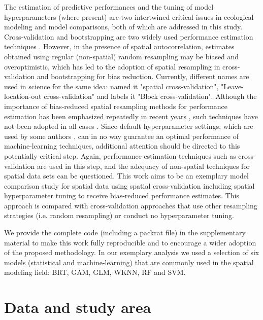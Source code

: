 \documentclass[review]{elsarticle}
\begin{document}
The estimation of predictive performances and the tuning of model hyperparameters (where present) are two intertwined critical issues in ecological modeling and model comparisons, both of which are addressed in this study.
Cross-validation and bootstrapping are two widely used performance estimation techniques \citep{Brenning2005, Kohavi1995}.
However, in the presence of spatial autocorrelation, estimates obtained using regular (non-spatial) random resampling may be biased and overoptimistic, which has led to the adoption of spatial resampling in cross-validation and bootstrapping for bias reduction.
Currently, different names are used in science for the same idea: \cite{Brenning2005} named it "spatial cross-validation", \cite{Meyer2018} "Leave-location-out cross-validation" and \cite{Roberts2017} labels it "Block cross-validation".
Although the importance of bias-reduced spatial resampling methods for performance estimation has been emphasized repeatedly in recent years \citep{Geiss2017, Meyer2018, Wenger2012}, such techniques have not been adopted in all cases  \citep{Bui2015, Pourghasemi2018, Smolinski2016, Wollan2008, Youssef2015}.
Since default hyperparameter settings, which are used by some authors \citep{Goetz2015, Russ2010a, Russ2010b, Vorpahl2012}, can in no way guarantee an optimal performance of machine-learning techniques, additional attention should be directed to this potentially critical step.
Again, performance estimation techniques such as cross-validation are used in this step, and the adequacy of non-spatial techniques for spatial data sets can be questioned.
This work aims to be an exemplary model comparison study for spatial data using spatial cross-validation including spatial hyperparameter tuning to receive bias-reduced performance estimates.
This approach is compared with cross-validation approaches that use other resampling strategies (i.e. random resampling) or conduct no hyperparameter tuning.

We provide the complete code (including a packrat file) in the supplementary material to make this work fully reproducible and to encourage a wider adoption of the proposed methodology.
In our exemplary analysis we used a selection of six models (statistical and machine-learning) that are commonly used in the spatial modeling field: \ac{BRT}, \ac{GAM}, \ac{GLM}, \ac{WKNN}, \ac{RF} and \ac{SVM}.

\section{Data and study area}
\end{document}
